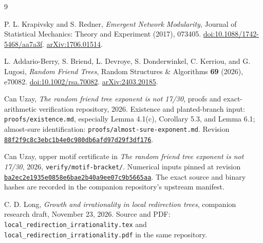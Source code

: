 \documentclass[11pt]{article}
\theoremstyle{definition}
\theoremstyle{remark}
\begin{document}
\begin{thebibliography}{9}

P. L. Krapivsky and S. Redner,
\emph{Emergent Network Modularity},
Journal of Statistical Mechanics: Theory and Experiment (2017), 073405.
\href{https://doi.org/10.1088/1742-5468/aa7a3f}{doi:10.1088/1742-5468/aa7a3f}.
\href{https://arxiv.org/abs/1706.01514}{arXiv:1706.01514}.

L. Addario-Berry, S. Briend, L. Devroye, S. Donderwinkel,
C. Kerriou, and G. Lugosi,
\emph{Random Friend Trees}, Random Structures \& Algorithms
\textbf{69} (2026), e70082.
\href{https://doi.org/10.1002/rsa.70082}{doi:10.1002/rsa.70082}.
\href{https://arxiv.org/abs/2403.20185}{arXiv:2403.20185}.

Can Uzay,
\emph{The random friend tree exponent is not 17/30},
proofs and exact-arithmetic verification repository, 2026.
Existence and planted-branch input: \texttt{proofs/existence.md},
especially Lemma 4.1(c), Corollary 5.3, and Lemma 6.1;
almost-sure identification: \texttt{proofs/almost-sure-exponent.md}.
Revision
\href{https://github.com/uzay-eth/friend-tree-exponent/tree/88f2f9c8c3ebc1b4e0c980db6afd97d29f3df176}{\texttt{88f2f9c8c3ebc1b4e0c980db6afd97d29f3df176}}.

Can Uzay, upper motif certificate in
\emph{The random friend tree exponent is not 17/30}, 2026,
\texttt{verify/motif-bracket/}.
Numerical inputs pinned at revision
\href{https://github.com/uzay-eth/friend-tree-exponent/tree/ba2ec2e1935e0858e6bae2b40a9ee07c9b5665aa}{\texttt{ba2ec2e1935e0858e6bae2b40a9ee07c9b5665aa}}.
The exact source and binary hashes are recorded in the companion
repository's upstream manifest.

C. D. Long,
\emph{Growth and irrationality in local redirection trees},
companion research draft, November 23, 2026.
Source and PDF: \texttt{local\_redirection\_irrationality.tex} and
\texttt{local\_redirection\_irrationality.pdf} in the same repository.

\end{thebibliography}
\end{document}
